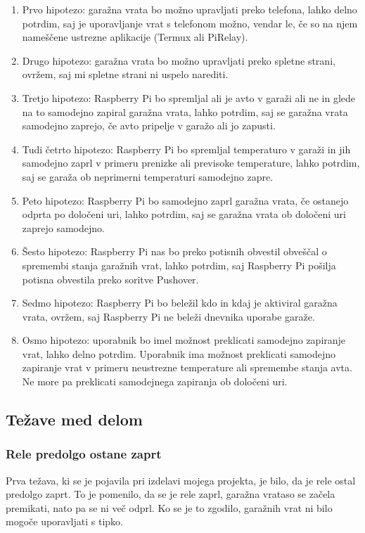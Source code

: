 \documentclass[11pt]{article}
\begin{document}
\begin{enumerate}
  \item Prvo hipotezo: garažna vrata bo možno upravljati preko telefona, lahko delno potrdim, saj je uporavljanje vrat s telefonom možno, vendar le, če so na njem nameščene ustrezne aplikacije (Termux ali PiRelay).
  \item Drugo hipotezo: garažna vrata bo možno upravljati preko spletne strani, ovržem, saj mi spletne strani ni uspelo narediti.
  \item Tretjo hipotezo: Raspberry Pi bo spremljal ali je avto v garaži ali ne in glede na to samodejno zapiral garažna vrata, lahko potrdim, saj se garažna vrata samodejno zaprejo, če avto pripelje v garažo ali jo zapusti.
  \item Tudi četrto hipotezo: Raspberry Pi bo spremljal temperaturo v garaži in jih samodejno zaprl v primeru prenizke ali previsoke temperature, lahko potrdim, saj se garaža ob neprimerni temperaturi samodejno zapre.
  \item Peto hipotezo: Raspberry Pi bo samodejno zaprl garažna vrata, če ostanejo odprta po določeni uri, lahko potrdim, saj se garažna vrata ob določeni uri zaprejo samodejno.
  \item Šesto hipotezo: Raspberry Pi nas bo preko potisnih obvestil obveščal o spremembi stanja garažnih vrat, lahko potrdim, saj Raspberry Pi pošilja potisna obvestila preko soritve Pushover.
  \item Sedmo hipotezo: Raspberry Pi bo beležil kdo in kdaj je aktiviral garažna vrata, ovržem, saj Raspberry Pi ne beleži dnevnika uporabe garaže.
  \item Osmo hipotezo: uporabnik bo imel možnost preklicati samodejno zapiranje vrat, lahko delno potrdim. Uporabnik ima možnost preklicati samodejno zapiranje vrat v primeru neustrezne temperature ali spremembe stanja avta. Ne more pa preklicati samodejnega zapiranja ob določeni uri.
\end{enumerate}
\subsection{Težave med delom}
\subsubsection{Rele predolgo ostane zaprt}
Prva težava, ki se je pojavila pri izdelavi mojega projekta, je bilo, da je rele ostal predolgo zaprt. To je pomenilo, da se je rele zaprl, garažna vrataso se začela premikati, nato pa se ni več odprl. Ko se je to zgodilo, garažnih vrat ni bilo mogoče uporavljati s tipko.
\end{document}
